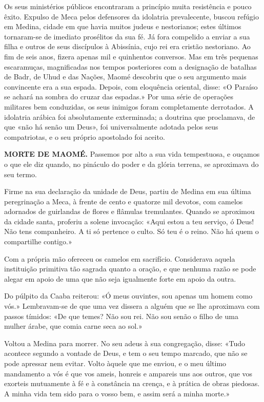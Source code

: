\documentclass[11pt,a5paper,twoside,openany]{book}
\begin{document}
Os seus ministérios públicos encontraram a princípio muita resistência e pouco êxito. Expulso de Meca pelos defensores da idolatria prevalecente, buscou refúgio em Medina, cidade em que havia muitos judeus e nestorianos; estes últimos tornaram-se de imediato prosélitos da sua fé. Já fora compelido a enviar a sua filha e outros de seus discípulos à Abissínia, cujo rei era cristão nestoriano. Ao fim de seis anos, fizera apenas mil e quinhentos conversos. Mas em três pequenas escaramuças, magnificadas nos tempos posteriores com a designação de batalhas de Badr, de Uhud e das Nações, Maomé descobriu que o seu argumento mais convincente era a sua espada. Depois, com eloquência oriental, disse: «O Paraíso se achará na sombra do cruzar das espadas.» Por uma série de operações militares bem conduzidas, os seus inimigos foram completamente derrotados. A idolatria arábica foi absolutamente exterminada; a doutrina que proclamava, de que «não há senão um Deus», foi universalmente adotada pelos seus compatriotas, e o seu próprio apostolado foi aceito.

\textbf{MORTE DE MAOMÉ.} Passemos por alto a sua vida tempestuosa, e ouçamos o que ele diz quando, no pináculo do poder e da glória terrena, se aproximava do seu termo.

Firme na sua declaração da unidade de Deus, partiu de Medina em sua última peregrinação a Meca, à frente de cento e quatorze mil devotos, com camelos adornados de guirlandas de flores e flâmulas tremulantes. Quando se aproximou da cidade santa, proferiu a solene invocação: «Aqui estou a teu serviço, ó Deus! Não tens companheiro. A ti só pertence o culto. Só teu é o reino. Não há quem o compartilhe contigo.»

Com a própria mão ofereceu os camelos em sacrifício. Considerava aquela instituição primitiva tão sagrada quanto a oração, e que nenhuma razão se pode alegar em apoio de uma que não seja igualmente forte em apoio da outra.

Do púlpito da Caaba reiterou: «Ó meus ouvintes, sou apenas um homem como vós.» Lembravam-se de que uma vez dissera a alguém que se lhe aproximava com passos tímidos: «De que temes? Não sou rei. Não sou senão o filho de uma mulher árabe, que comia carne seca ao sol.»

Voltou a Medina para morrer. No seu adeus à sua congregação, disse: «Tudo acontece segundo a vontade de Deus, e tem o seu tempo marcado, que não se pode apressar nem evitar. Volto àquele que me enviou, e o meu último mandamento a vós é que vos ameis, honreis e ampareis uns aos outros, que vos exorteis mutuamente à fé e à constância na crença, e à prática de obras piedosas. A minha vida tem sido para o vosso bem, e assim será a minha morte.»
\end{document}
